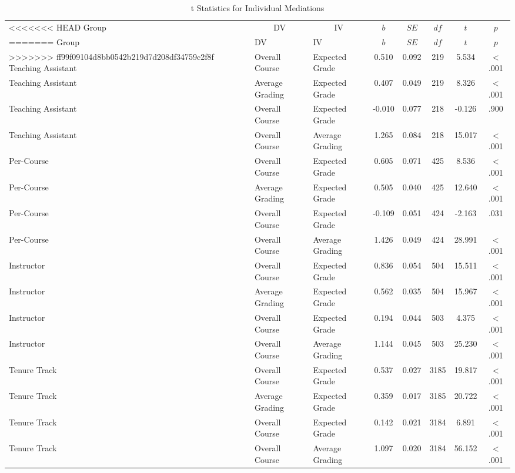 \documentclass[,man]{apa6}
\theoremstyle{definition}
\theoremstyle{definition}
\theoremstyle{definition}
\theoremstyle{remark}
\begin{document}
\begin{table}[tbp]
\begin{center}
\begin{threeparttable}
\caption{\label{tab:table-med-split}t Statistics for Individual Mediations}
\begin{tabular}{lllccccc}
\toprule
<<<<<<< HEAD
Group & \multicolumn{1}{c}{DV} & \multicolumn{1}{c}{IV} & \multicolumn{1}{c}{$b$} & \multicolumn{1}{c}{$SE$} & \multicolumn{1}{c}{$df$} & \multicolumn{1}{c}{$t$} & \multicolumn{1}{c}{$p$}\\
=======
Group & DV & IV & $b$ & $SE$ & $df$ & $t$ & $p$\\
>>>>>>> ff99f09104d8bb0542b219d7d208df34759c2f8f
\midrule
Teaching Assistant & Overall Course & Expected Grade & 0.510 & 0.092 & 219 & 5.534 & < .001\\
Teaching Assistant & Average Grading & Expected Grade & 0.407 & 0.049 & 219 & 8.326 & < .001\\
Teaching Assistant & Overall Course & Expected Grade & -0.010 & 0.077 & 218 & -0.126 & .900\\
Teaching Assistant & Overall Course & Average Grading & 1.265 & 0.084 & 218 & 15.017 & < .001\\
Per-Course & Overall Course & Expected Grade & 0.605 & 0.071 & 425 & 8.536 & < .001\\
Per-Course & Average Grading & Expected Grade & 0.505 & 0.040 & 425 & 12.640 & < .001\\
Per-Course & Overall Course & Expected Grade & -0.109 & 0.051 & 424 & -2.163 & .031\\
Per-Course & Overall Course & Average Grading & 1.426 & 0.049 & 424 & 28.991 & < .001\\
Instructor & Overall Course & Expected Grade & 0.836 & 0.054 & 504 & 15.511 & < .001\\
Instructor & Average Grading & Expected Grade & 0.562 & 0.035 & 504 & 15.967 & < .001\\
Instructor & Overall Course & Expected Grade & 0.194 & 0.044 & 503 & 4.375 & < .001\\
Instructor & Overall Course & Average Grading & 1.144 & 0.045 & 503 & 25.230 & < .001\\
Tenure Track & Overall Course & Expected Grade & 0.537 & 0.027 & 3185 & 19.817 & < .001\\
Tenure Track & Average Grading & Expected Grade & 0.359 & 0.017 & 3185 & 20.722 & < .001\\
Tenure Track & Overall Course & Expected Grade & 0.142 & 0.021 & 3184 & 6.891 & < .001\\
Tenure Track & Overall Course & Average Grading & 1.097 & 0.020 & 3184 & 56.152 & < .001\\
\bottomrule
\end{tabular}
\end{threeparttable}
\end{center}
\end{table}
\end{document}
